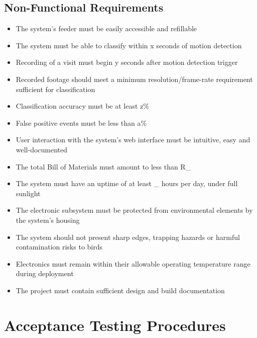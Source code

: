 \subsection{Non-Functional Requirements}
\label{subsec:NonFunctionalRequirements}
\begin{itemize}
    \item The system's feeder must be easily accessible and refillable
    \item The system must be able to classify within x seconds of motion detection
    \item Recording of a visit must begin y seconds after motion detection trigger
    \item Recorded footage should meet a minimum resolution/frame-rate requirement sufficient for classification
    \item Classification accuracy must be at least z\%
    \item False positive events must be less than a\%
    \item User interaction with the system's web interface must be intuitive, easy and well-documented
    \item The total Bill of Materials must amount to less than R\_
    \item The system must have an uptime of at least \_ hours per day, under full sunlight
    \item The electronic subsystem must be protected from environmental elements by the system's housing
    \item The system should not present sharp edges, trapping hazards or harmful contamination risks to birds
    \item Electronics must remain within their allowable operating temperature range during deployment
    \item The project must contain sufficient design and build documentation
\end{itemize}

\section{Acceptance Testing Procedures}
\label{sec:AcceptanceTestingProcedures}

